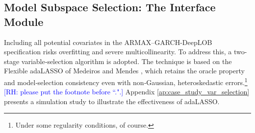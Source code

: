 \documentclass[10pt,a4paper,oneside]{article}
\newcommand{\rh}[1]{\textcolor{blue}{\textsf{[RH: #1]}}}
\begin{document}






\subsection{Model Subspace Selection: The Interface Module}
\label{subsec:covariates_selection}

Including all potential covariates in the ARMAX–GARCH-DeepLOB specification risks overfitting and severe multicollinearity. To address this, a two-stage variable‐selection algorithm is adopted. The technique is based on the Flexible adaLASSO of Medeiros and Mendes \cite{MEDEIROS2016255}, which retains the oracle property and model‐selection consistency even with non‐Gaussian, heteroskedastic errors.\footnote{Under some regularity conditions, of course.} \rh{please put the footnote before ``.".} Appendix \ref{ap:case_study_var_selection} presents a simulation study to illustrate the effectiveness of adaLASSO.

\end{document}
